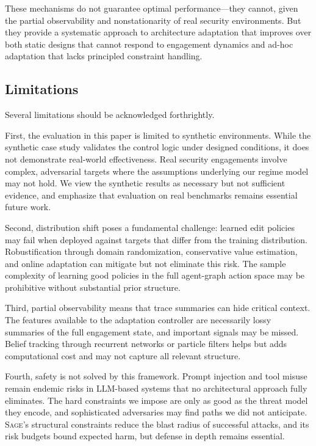 \documentclass[sigconf,anonymous]{acmart}
\newcommand{\SAGE}{\textsc{Sage}\xspace}
\begin{document}
These mechanisms do not guarantee optimal performance---they cannot, given the partial observability and nonstationarity of real security environments. But they provide a systematic approach to architecture adaptation that improves over both static designs that cannot respond to engagement dynamics and ad-hoc adaptation that lacks principled constraint handling.

\subsection{Limitations}

Several limitations should be acknowledged forthrightly. 

First, the evaluation in this paper is limited to synthetic environments. While the synthetic case study validates the control logic under designed conditions, it does not demonstrate real-world effectiveness. Real security engagements involve complex, adversarial targets where the assumptions underlying our regime model may not hold. We view the synthetic results as necessary but not sufficient evidence, and emphasize that evaluation on real benchmarks remains essential future work.

Second, distribution shift poses a fundamental challenge: learned edit policies may fail when deployed against targets that differ from the training distribution. Robustification through domain randomization, conservative value estimation, and online adaptation can mitigate but not eliminate this risk. The sample complexity of learning good policies in the full agent-graph action space may be prohibitive without substantial prior structure.

Third, partial observability means that trace summaries can hide critical context. The features available to the adaptation controller are necessarily lossy summaries of the full engagement state, and important signals may be missed. Belief tracking through recurrent networks or particle filters helps but adds computational cost and may not capture all relevant structure.

Fourth, safety is not solved by this framework. Prompt injection and tool misuse remain endemic risks in LLM-based systems that no architectural approach fully eliminates. The hard constraints we impose are only as good as the threat model they encode, and sophisticated adversaries may find paths we did not anticipate. \SAGE's structural constraints reduce the blast radius of successful attacks, and its risk budgets bound expected harm, but defense in depth remains essential.
\end{document}
